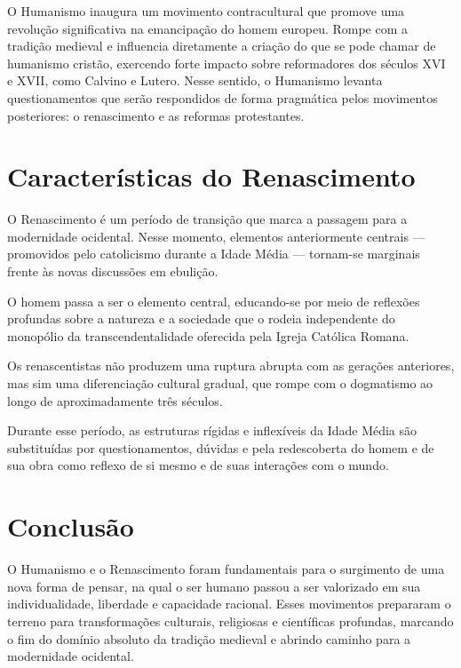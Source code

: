 \documentclass[
    article,            %
	12pt,				%
	oneside,			%
	a4paper,			%
	chapter=TITLE,		%
	section=TITLE,		%
	subsection=TITLE,	%
	english,			%
	french,				%
	spanish,			%
	brazil				%
	]{abntex2}
\begin{document}
O Humanismo inaugura um movimento contracultural que promove uma revolução significativa na emancipação do homem europeu. Rompe com a tradição medieval e influencia diretamente a criação do que se pode chamar de humanismo cristão, exercendo forte impacto sobre reformadores dos séculos XVI e XVII, como Calvino e Lutero. Nesse sentido, o Humanismo levanta questionamentos que serão respondidos de forma pragmática pelos movimentos posteriores: o renascimento e as reformas protestantes.

\section{Características do Renascimento}
O Renascimento é um período de transição que marca a passagem para a modernidade ocidental. Nesse momento, elementos anteriormente centrais — promovidos pelo catolicismo durante a Idade Média — tornam-se marginais frente às novas discussões em ebulição.

O homem passa a ser o elemento central, educando-se por meio de reflexões profundas sobre a natureza e a sociedade que o rodeia independente do monopólio da transcendentalidade oferecida pela Igreja Católica Romana.

Os renascentistas não produzem uma ruptura abrupta com as gerações anteriores, mas sim uma diferenciação cultural gradual, que rompe com o dogmatismo ao longo de aproximadamente três séculos.

Durante esse período, as estruturas rígidas e inflexíveis da Idade Média são substituídas por questionamentos, dúvidas e pela redescoberta do homem e de sua obra como reflexo de si mesmo e de suas interações com o mundo.

\section{Conclusão}
O Humanismo e o Renascimento foram fundamentais para o surgimento de uma nova forma de pensar, na qual o ser humano passou a ser valorizado em sua individualidade, liberdade e capacidade racional. Esses movimentos prepararam o terreno para transformações culturais, religiosas e científicas profundas, marcando o fim do domínio absoluto da tradição medieval e abrindo caminho para a modernidade ocidental.


% 
\end{document}
